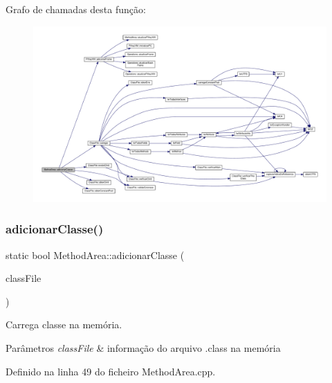 Grafo de chamadas desta função\+:\nopagebreak
\begin{figure}[H]
\begin{center}
\leavevmode
\includegraphics[width=350pt]{classMethodArea_a30233142aefa26c17a3a222582cb56c1_cgraph}
\end{center}
\end{figure}
\mbox{\label{classMethodArea_ac2a5ab0e6b36c9af7062f145218b4cf0}} 
\subsubsection{\texorpdfstring{adicionar\+Classe()}{adicionarClasse()}\hspace{0.1cm}{\footnotesize\ttfamily [2/2]}}
{\footnotesize\ttfamily static bool Method\+Area\+::adicionar\+Classe (\begin{DoxyParamCaption}\item[{\hyperlink{classClassFile}{Class\+File} $\ast$}]{class\+File }\end{DoxyParamCaption})\hspace{0.3cm}{\ttfamily [static]}}



Carrega classe na memória. 


\begin{DoxyParams}{Parâmetros}
{\em class\+File} & informação do arquivo .class na memória \\
\hline
\end{DoxyParams}


Definido na linha 49 do ficheiro Method\+Area.\+cpp.



